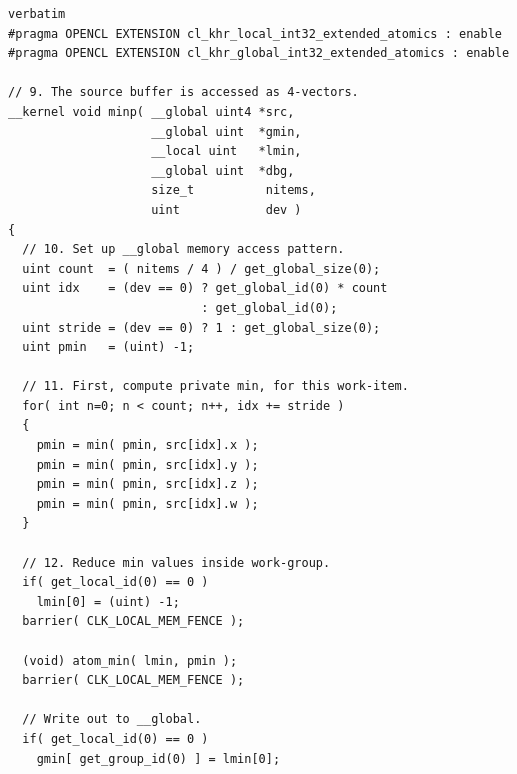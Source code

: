 \documentclass[a4paper]{report}
\begin{document}
{
\begin{lstlisting}verbatim
#pragma OPENCL EXTENSION cl_khr_local_int32_extended_atomics : enable
#pragma OPENCL EXTENSION cl_khr_global_int32_extended_atomics : enable
                                                                    
// 9. The source buffer is accessed as 4-vectors.                  
__kernel void minp( __global uint4 *src,                            
                    __global uint  *gmin,
                    __local uint   *lmin,                             
                    __global uint  *dbg,                             
                    size_t          nitems,                          
                    uint            dev )                            
{                                                                   
  // 10. Set up __global memory access pattern.                    
  uint count  = ( nitems / 4 ) / get_global_size(0);                
  uint idx    = (dev == 0) ? get_global_id(0) * count             
                           : get_global_id(0);                    
  uint stride = (dev == 0) ? 1 : get_global_size(0);               
  uint pmin   = (uint) -1;                                        
                                                                    
  // 11. First, compute private min, for this work-item.           
  for( int n=0; n < count; n++, idx += stride )                    
  {                                                                
    pmin = min( pmin, src[idx].x );                               
    pmin = min( pmin, src[idx].y );                               
    pmin = min( pmin, src[idx].z );                               
    pmin = min( pmin, src[idx].w );                               
  }                                                                
                                                                    
  // 12. Reduce min values inside work-group.                      
  if( get_local_id(0) == 0 )                                       
    lmin[0] = (uint) -1;                                          
  barrier( CLK_LOCAL_MEM_FENCE );                                  

  (void) atom_min( lmin, pmin );                                   
  barrier( CLK_LOCAL_MEM_FENCE );                                  
                                                                    
  // Write out to __global.                                        
  if( get_local_id(0) == 0 )                                       
    gmin[ get_group_id(0) ] = lmin[0];                            
                                                               

\end{lstlisting}}
\end{document}
